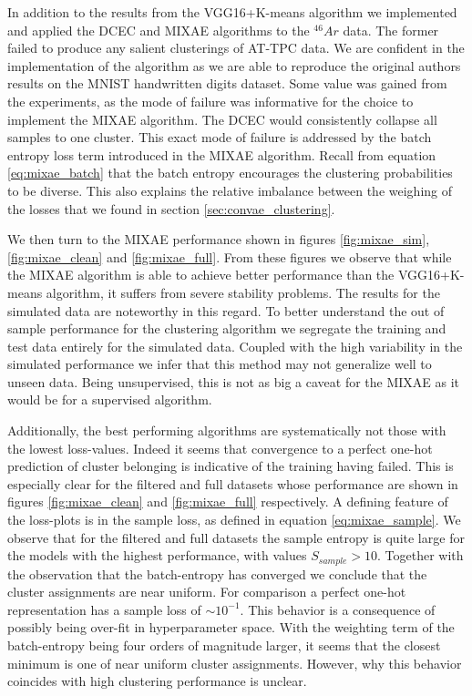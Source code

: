 In addition to the results from the VGG16+K-means algorithm we implemented and applied the DCEC and MIXAE algorithms to the ${}^{46}Ar$ data. The former failed to produce any salient clusterings of AT-TPC data. We are confident in the implementation of the algorithm as we are able to reproduce the original authors results on the MNIST handwritten digits dataset. Some value was gained from the experiments, as the mode of failure was informative for the choice to implement the MIXAE algorithm. The DCEC would consistently collapse all samples to one cluster. This exact mode of failure is addressed by the batch entropy loss term introduced in the MIXAE algorithm. Recall from equation \ref{eq:mixae_batch} that the batch entropy encourages the clustering probabilities to be diverse. This also explains the relative imbalance between the weighing of the losses that we found in section \ref{sec:convae_clustering}.

We then turn to the MIXAE performance shown in figures \ref{fig:mixae_sim}, \ref{fig:mixae_clean} and \ref{fig:mixae_full}. From these figures we observe that while the MIXAE algorithm is able to achieve better performance than the VGG16+K-means algorithm, it suffers from severe stability problems. The results for the simulated data are noteworthy in this regard. To better understand the out of sample performance for the clustering algorithm we segregate the training and test data entirely for the simulated data. Coupled with the high variability in the simulated performance we infer that this method may not generalize well to unseen data. Being unsupervised, this is not as big a caveat for the MIXAE as it would be for a supervised algorithm.

 Additionally, the best performing algorithms are systematically not those with the lowest loss-values. Indeed it seems that convergence to a perfect one-hot prediction of cluster belonging is indicative of the training having failed. This is especially clear for the filtered and full datasets whose performance are shown in figures \ref{fig:mixae_clean} and \ref{fig:mixae_full} respectively. A defining feature of the loss-plots is in the sample loss, as defined in equation \ref{eq:mixae_sample}. We observe that for the filtered and full datasets the sample entropy is quite large for the models with the highest performance, with values $S_{sample} > 10$. Together with the observation that the batch-entropy has converged we conclude that the cluster assignments are near uniform. For comparison a perfect one-hot representation has a sample loss of $\sim 10^{-1}$. This behavior is a consequence of possibly being over-fit in hyperparameter space. With the weighting term of the batch-entropy being four orders of magnitude larger, it seems that the closest minimum is one of near uniform cluster assignments. However, why this behavior coincides with high clustering performance is unclear.

